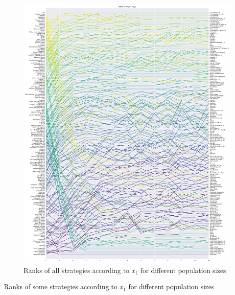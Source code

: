 \documentclass{article}
\begin{document}
\begin{figure}[!hbtp]
    \centering
    \includegraphics[height=.9\textheight]{./img/average_rank_vs_population_size_invade.pdf}
    \caption{Ranks of all strategies according to \(x_1\) for different
    population sizes}
    \label{fig:ranks_v_size_invade}
\end{figure}

\begin{table}[!hbtp]
    \centering
    \scriptsize
    
    \caption{Ranks of some strategies according to \(x_1\) for different
    population sizes}
    \label{tbl:ranks_v_size_invade}
\end{table}
\end{document}
